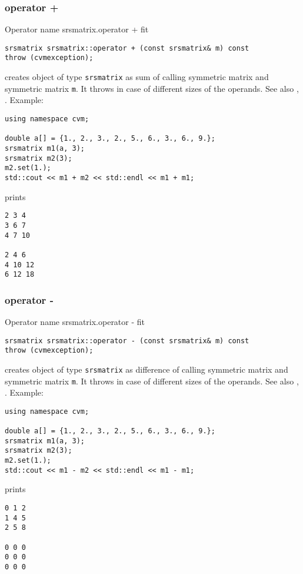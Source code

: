 \subsubsection{operator +}
Operator%
\pdfdest name {srsmatrix.operator +} fit
\begin{verbatim}
srsmatrix srsmatrix::operator + (const srsmatrix& m) const
throw (cvmexception);
\end{verbatim}
creates  object of type \verb"srsmatrix" as  sum of
 calling symmetric matrix and symmetric matrix \verb"m".
It throws  
in case of different sizes of the operands.
See also , .
Example:
\begin{Verbatim}
using namespace cvm;

double a[] = {1., 2., 3., 2., 5., 6., 3., 6., 9.};
srsmatrix m1(a, 3);
srsmatrix m2(3);
m2.set(1.);
std::cout << m1 + m2 << std::endl << m1 + m1;
\end{Verbatim}
prints
\begin{Verbatim}
2 3 4
3 6 7
4 7 10

2 4 6
4 10 12
6 12 18
\end{Verbatim}
\newpage




\subsubsection{operator -}
Operator%
\pdfdest name {srsmatrix.operator -} fit
\begin{verbatim}
srsmatrix srsmatrix::operator - (const srsmatrix& m) const
throw (cvmexception);
\end{verbatim}
creates  object of type \verb"srsmatrix" as  difference of
 calling symmetric matrix and symmetric matrix \verb"m".
It throws  
in case of different sizes of the operands.
See also , .
Example:
\begin{Verbatim}
using namespace cvm;

double a[] = {1., 2., 3., 2., 5., 6., 3., 6., 9.};
srsmatrix m1(a, 3);
srsmatrix m2(3);
m2.set(1.);
std::cout << m1 - m2 << std::endl << m1 - m1;
\end{Verbatim}
prints
\begin{Verbatim}
0 1 2
1 4 5
2 5 8

0 0 0
0 0 0
0 0 0
\end{Verbatim}
\newpage



